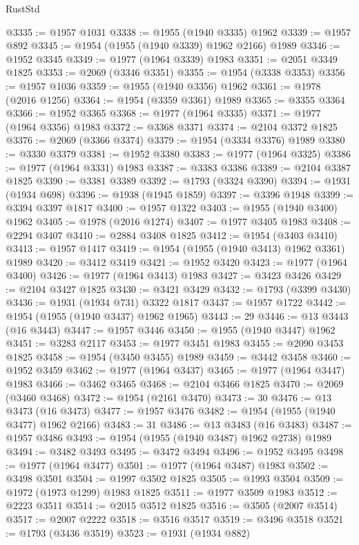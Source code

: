 \begin{lexlean}{RustStd}
\begin{coremodule}
@3335 := @1957 @1031
@3338 := @1955 (@1940 @3335) @1962
@3339 := @1957 @892
@3345 := @1954 (@1955 (@1940 @3339) @1962 @2166) @1989
@3346 := @1952 @3345
@3349 := @1977 (@1964 @3339) @1983
@3351 := @2051 @3349 @1825
@3353 := @2069 (@3346 @3351)
@3355 := @1954 (@3338 @3353)
@3356 := @1957 @1036
@3359 := @1955 (@1940 @3356) @1962
@3361 := @1978 (@2016 @1256)
@3364 := @1954 (@3359 @3361) @1989
@3365 := @3355 @3364
@3366 := @1952 @3365
@3368 := @1977 (@1964 @3335)
@3371 := @1977 (@1964 @3356) @1983
@3372 := @3368 @3371
@3374 := @2104 @3372 @1825
@3376 := @2069 (@3366 @3374)
@3379 := @1954 (@3334 @3376) @1989
@3380 := @3330 @3379
@3381 := @1952 @3380
@3383 := @1977 (@1964 @3325)
@3386 := @1977 (@1964 @3331) @1983
@3387 := @3383 @3386
@3389 := @2104 @3387 @1825
@3390 := @3381 @3389
@3392 := @1793 (@3324 @3390)
@3394 := @1931 (@1934 @698)
@3396 := @1938 (@1945 @1859)
@3397 := @3396 @1948
@3399 := @3394 @3397 @1817
@3400 := @1957 @1322
@3403 := @1955 (@1940 @3400) @1962
@3405 := @1978 (@2016 @1274)
@3407 := @1977 @3405 @1983
@3408 := @2294 @3407
@3410 := @2884 @3408 @1825
@3412 := @1954 (@3403 @3410)
@3413 := @1957 @1417
@3419 := @1954 (@1955 (@1940 @3413) @1962 @3361) @1989
@3420 := @3412 @3419
@3421 := @1952 @3420
@3423 := @1977 (@1964 @3400)
@3426 := @1977 (@1964 @3413) @1983
@3427 := @3423 @3426
@3429 := @2104 @3427 @1825
@3430 := @3421 @3429
@3432 := @1793 (@3399 @3430)
@3436 := @1931 (@1934 @731) @3322 @1817
@3437 := @1957 @1722
@3442 := @1954 (@1955 (@1940 @3437) @1962 @1965)
@3443 := 29
@3446 := @13 @3443 (@16 @3443)
@3447 := @1957 @3446
@3450 := @1955 (@1940 @3447) @1962
@3451 := @3283 @2117
@3453 := @1977 @3451 @1983
@3455 := @2090 @3453 @1825
@3458 := @1954 (@3450 @3455) @1989
@3459 := @3442 @3458
@3460 := @1952 @3459
@3462 := @1977 (@1964 @3437)
@3465 := @1977 (@1964 @3447) @1983
@3466 := @3462 @3465
@3468 := @2104 @3466 @1825
@3470 := @2069 (@3460 @3468)
@3472 := @1954 (@2161 @3470)
@3473 := 30
@3476 := @13 @3473 (@16 @3473)
@3477 := @1957 @3476
@3482 := @1954 (@1955 (@1940 @3477) @1962 @2166)
@3483 := 31
@3486 := @13 @3483 (@16 @3483)
@3487 := @1957 @3486
@3493 := @1954 (@1955 (@1940 @3487) @1962 @2738) @1989
@3494 := @3482 @3493
@3495 := @3472 @3494
@3496 := @1952 @3495
@3498 := @1977 (@1964 @3477)
@3501 := @1977 (@1964 @3487) @1983
@3502 := @3498 @3501
@3504 := @1997 @3502 @1825
@3505 := @1993 @3504
@3509 := @1972 (@1973 @1299) @1983 @1825
@3511 := @1977 @3509 @1983
@3512 := @2223 @3511
@3514 := @2015 @3512 @1825
@3516 := @3505 (@2007 @3514)
@3517 := @2007 @2222
@3518 := @3516 @3517
@3519 := @3496 @3518
@3521 := @1793 (@3436 @3519)
@3523 := @1931 (@1934 @882)

\end{coremodule}
\end{lexlean}
